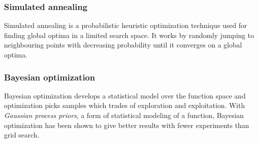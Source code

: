 \subsubsection{Simulated annealing}

Simulated annealing is a probabilistic heuristic optimization technique used for finding global optima in a limited search space. It works by randomly jumping to neighbouring points with decreasing probability until it converges on a global optima.


\subsubsection{Bayesian optimization}

Bayesian optimization develops a statistical model over the function space and optimization picks samples which trades of exploration and exploitation.  With \textit{Gaussian process priors}, a form of statistical modeling of a function, Bayesian optimization has been shown to give better results with fewer experiments than grid search. \citep{snoek2012practical}


